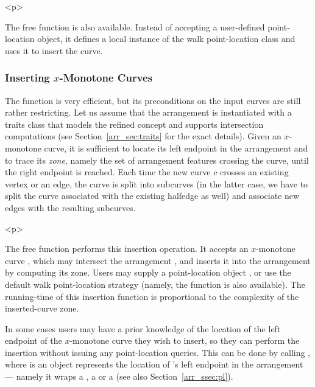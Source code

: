 \begin{ccHtmlOnly}<p>\end{ccHtmlOnly}
The free function  is also
available. Instead of accepting a user-defined point-location
object, it defines a local instance of the walk point-location
class and uses it to insert the curve.

\subsubsection{Inserting $x$-Monotone Curves}
\label{arr_sssec:insert_x_mon}
%
The  function is very
efficient, but its preconditions on the input curves are still
rather restricting. Let us assume that the arrangement is
instantiated with a traits class that models the refined
 concept and supports
intersection computations (see Section~\ref{arr_sec:traits} for
the exact details). Given an $x$-monotone curve, it is sufficient
to locate its left endpoint in the arrangement and to trace its
{\em zone}, namely the set of arrangement features crossing the curve,
until the right endpoint is reached. Each time the new curve $c$
crosses an existing vertex or an edge, the curve is split into
subcurves (in the latter case, we have to split the curve 
associated with the existing halfedge as well) and associate new
edges with the resulting subcurves.

\begin{ccHtmlOnly}<p>\end{ccHtmlOnly}
The free function  performs
this insertion operation. It accepts an $x$-monotone curve ,
which may intersect the arrangement , and inserts it into
the arrangement by computing its zone. Users may supply a
point-location object , or use the default walk
point-location strategy (namely, the function
 is also available). The
running-time of this insertion function is proportional to the
complexity of the inserted-curve zone.

\begin{ccAdvanced}
In some cases users may have a prior knowledge of the location of the
left endpoint of the $x$-monotone curve  they wish to insert,
so they can perform the insertion without issuing any point-location
queries. This can be done by calling
, where  is an
object represents the location of 's left endpoint in the
arrangement --- namely it wraps a , a
 or a  (see
also Section~\ref{arr_ssec:pl}).
\end{ccAdvanced}

